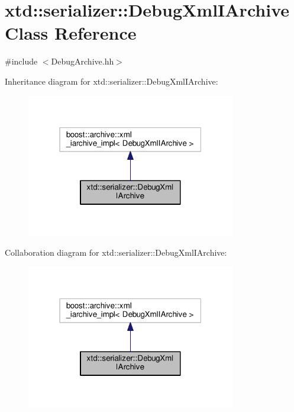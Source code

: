 \hypertarget{classxtd_1_1serializer_1_1DebugXmlIArchive}{}\section{xtd\+:\+:serializer\+:\+:Debug\+Xml\+I\+Archive Class Reference}
\label{classxtd_1_1serializer_1_1DebugXmlIArchive}


{\ttfamily \#include $<$Debug\+Archive.\+hh$>$}



Inheritance diagram for xtd\+:\+:serializer\+:\+:Debug\+Xml\+I\+Archive\+:
\nopagebreak
\begin{figure}[H]
\begin{center}
\leavevmode
\includegraphics[width=259pt]{classxtd_1_1serializer_1_1DebugXmlIArchive__inherit__graph}
\end{center}
\end{figure}


Collaboration diagram for xtd\+:\+:serializer\+:\+:Debug\+Xml\+I\+Archive\+:
\nopagebreak
\begin{figure}[H]
\begin{center}
\leavevmode
\includegraphics[width=259pt]{classxtd_1_1serializer_1_1DebugXmlIArchive__coll__graph}
\end{center}
\end{figure}
